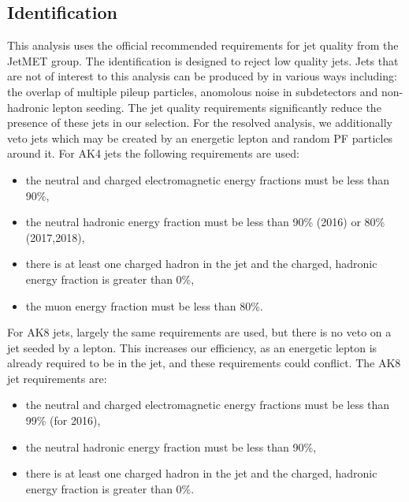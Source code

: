 \subsection{Identification}
This analysis uses the official recommended requirements for jet quality from the \CMS JetMET group. The identification is designed to reject low quality jets. Jets that are not of interest to this analysis can be produced by in various ways including: the overlap of multiple pileup particles, anomolous noise in subdetectors and non-hadronic lepton seeding. The jet quality requirements significantly reduce the presence of these jets in our selection.  For the resolved analysis, we additionally veto jets which may be created by an energetic lepton and random PF particles around it.
For AK4 jets the following requirements are used:
\begin{description}
  \begin{itemize}
      \item the neutral and charged electromagnetic energy fractions must be less than 90\%,
      \item the neutral hadronic energy fraction must be less than 90\% (2016) or 80\% (2017,2018),
      \item there is at least one charged hadron in the jet and the charged, hadronic energy fraction is greater than 0\%,
      \item the muon energy fraction must be less than 80\%.
  \end{itemize}
\end{description}
For AK8 jets, largely the same requirements are used, but there is no veto on a jet seeded by a lepton. This increases our efficiency, as an energetic lepton is already required to be in the jet, and these requirements could conflict. The AK8 jet requirements are:
\begin{description}
  \begin{itemize}
      \item the neutral and charged electromagnetic energy fractions must be less than 99\% (for 2016),
      \item the neutral hadronic energy fraction must be less than 90\%,
      \item there is at least one charged hadron in the jet and the charged, hadronic energy fraction is greater than 0\%.
  \end{itemize}
\end{description}

